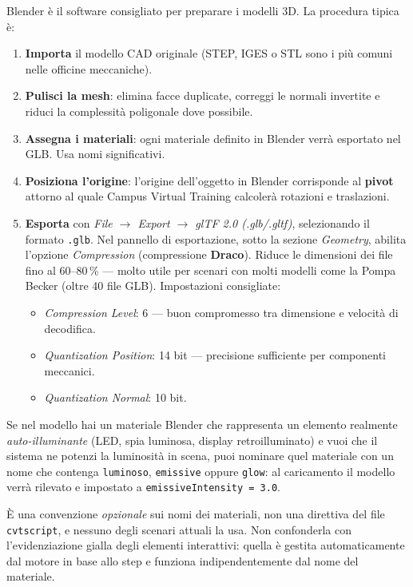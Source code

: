 ﻿\documentclass[a4paper,12pt,oneside]{book}
\newcommand{\file}[1]{\texttt{#1}}
\begin{document}
Blender è il software consigliato per preparare i modelli 3D. La
procedura tipica è:

\begin{enumerate}
  \item \textbf{Importa} il modello CAD originale (STEP, IGES o STL sono
        i più comuni nelle officine meccaniche).
  \item \textbf{Pulisci la mesh}: elimina facce duplicate, correggi le
        normali invertite e riduci la complessità poligonale dove
        possibile.
  \item \textbf{Assegna i materiali}: ogni materiale definito in Blender
        verrà esportato nel GLB. Usa nomi significativi.
  \item \textbf{Posiziona l'origine}: l'origine dell'oggetto in Blender
        corrisponde al \textbf{pivot} attorno al quale Campus Virtual
        Training calcolerà rotazioni e traslazioni.
  \item \textbf{Esporta} con \emph{File $\rightarrow$ Export $\rightarrow$
        glTF 2.0 (.glb/.gltf)}, selezionando il formato \file{.glb}.
        Nel pannello di esportazione, sotto la sezione \emph{Geometry},
        abilita l'opzione \emph{Compression} (compressione \textbf{Draco}).
        Riduce le dimensioni dei file fino al 60--80\,\% --- molto utile
        per scenari con molti modelli come la Pompa Becker (oltre 40 file
        GLB). Impostazioni consigliate:
    \begin{itemize}
      \item \emph{Compression Level}: 6 --- buon compromesso tra
            dimensione e velocità di decodifica.
      \item \emph{Quantization Position}: 14 bit --- precisione sufficiente
            per componenti meccanici.
      \item \emph{Quantization Normal}: 10 bit.
    \end{itemize}
\end{enumerate}

\begin{notablu}
Se nel modello hai un materiale Blender che rappresenta un elemento
realmente \emph{auto-illuminante} (LED, spia luminosa, display retro\-illuminato)
e vuoi che il sistema ne potenzi la luminosità in scena, puoi nominare
quel materiale con un nome che contenga \texttt{luminoso},
\texttt{emissive} oppure \texttt{glow}: al caricamento il modello
verrà rilevato e impostato a \texttt{emissiveIntensity = 3.0}.

È una convenzione \emph{opzionale} sui nomi dei materiali, non una
direttiva del file \file{cvtscript}, e nessuno degli scenari attuali
la usa. Non confonderla con l'evidenziazione gialla degli elementi
interattivi: quella è gestita automaticamente dal motore in base allo
step e funziona indipendentemente dal nome del materiale.
\end{notablu}
\end{document}

